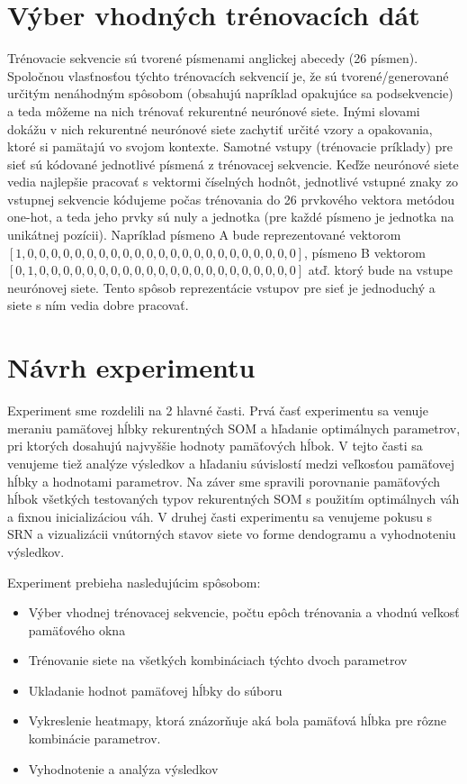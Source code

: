 \section{Výber vhodných trénovacích dát}
Trénovacie sekvencie sú tvorené písmenami anglickej abecedy (26 písmen).
Spoločnou vlasťnosťou týchto trénovacích sekvencií je, že sú tvorené/generované určitým nenáhodným spôsobom (obsahujú napríklad opakujúce sa podsekvencie)
a teda môžeme na nich trénovať rekurentné neurónové siete. 
Inými slovami dokážu v nich rekurentné neurónové siete zachytiť určité vzory a opakovania, ktoré si pamätajú vo svojom kontexte.
Samotné vstupy (trénovacie príklady) pre sieť sú kódované jednotlivé písmená z trénovacej sekvencie.
Keďže neurónové siete vedia najlepšie pracovať s vektormi číselných hodnôt, jednotlivé vstupné znaky zo 
vstupnej sekvencie kódujeme počas trénovania do 26 prvkového vektora metódou one-hot, 
a teda jeho prvky sú nuly a jednotka (pre každé písmeno je jednotka na unikátnej pozícii).
Napríklad písmeno A bude reprezentované vektorom
$[1, 0, 0, 0, 0, 0, 0, 0, 0, 0, 0, 0, 0, 0, 0, 0, 0, 0, 0, 0, 0, 0, 0, 0]$,
písmeno B vektorom $[0, 1, 0, 0, 0, 0, 0, 0, 0, 0, 0, 0, 0, 0, 0, 0, 0, 0, 0, 0, 0, 0, 0, 0]$ atď. 
ktorý bude na vstupe neurónovej siete.
Tento spôsob reprezentácie vstupov pre sieť je jednoduchý a siete s ním vedia dobre pracovať.


\section {Návrh experimentu}
Experiment sme rozdelili na 2 hlavné časti. 
Prvá časť experimentu sa venuje meraniu pamäťovej hĺbky rekurentných SOM a hľadanie 
optimálnych parametrov, pri ktorých dosahujú najvyššie hodnoty pamäťových hĺbok.
V tejto časti sa venujeme tiež analýze výsledkov a hľadaniu súvislostí medzi veľkosťou pamäťovej hĺbky 
a hodnotami parametrov. 
Na záver sme spravili porovnanie pamäťových hĺbok všetkých testovaných typov rekurentných SOM s 
použitím optimálnych váh a fixnou inicializáciou váh.
V druhej časti experimentu sa venujeme pokusu s SRN a vizualizácii vnútorných stavov siete vo forme 
dendogramu a vyhodnoteniu výsledkov.

Experiment prebieha nasledujúcim spôsobom:
\begin{itemize}
    \item Výber vhodnej trénovacej sekvencie, počtu epôch trénovania a vhodnú veľkosť pamäťového okna
    \item Trénovanie siete na všetkých kombináciach týchto dvoch parametrov
    \item Ukladanie hodnot pamäťovej hĺbky do súboru
    \item Vykreslenie heatmapy, ktorá znázorňuje aká bola pamäťová hĺbka pre rôzne kombinácie parametrov.
    \item Vyhodnotenie a analýza výsledkov
\end{itemize}


